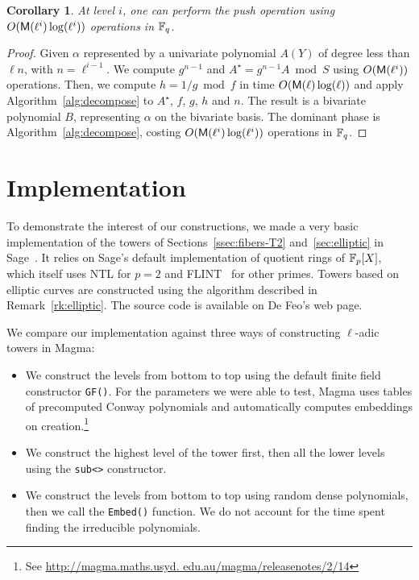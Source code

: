\documentclass{sig-alternate}
\newtheorem{corollary}[definition]{Corollary}
\begin{document}
\begin{corollary}
  At level $i$, one can perform the push operation using
  $O(\mathsf{M}(\ell^i)\log(\ell^i))$ operations in $\mathbb{F}_q$.
\end{corollary}
\begin{proof}
  Given $\alpha$ represented by a univariate polynomial $A(Y)$ of
  degree less than $\ell n$, with $n =\ell^{i-1}$. We compute
  $g^{n-1}$ and $A^\star = g^{n-1} A \bmod S$ using $O(\mathsf{M}(\ell^i))$
  operations. Then, we compute $h=1/g \bmod f$ in time
  $O(\mathsf{M}(\ell)\log(\ell))$ and apply Algorithm~\ref{alg:decompose}
  to $A^\star$, $f$, $g$, $h$ and $n$. The result is a bivariate
  polynomial $B$, representing $\alpha$ on the bivariate basis. The
  dominant phase is Algorithm~\ref{alg:decompose}, costing
  $O(\mathsf{M}(\ell^i)\log(\ell^i))$ operations in $\mathbb{F}_q$.
\end{proof}


\section{Implementation}
\label{sec:impl}
To demonstrate the interest of our constructions, we made a very basic
implementation of the towers of Sections~\ref{ssec:fibers-T2}
and~\ref{sec:elliptic} in Sage~\cite{Sage}. It relies on Sage's
default implementation of quotient rings of $\mathbb{F}_p[X]$, which itself
uses NTL \cite{shoup2003ntl} for $p=2$ and FLINT~\cite{hart2010flint}
for other primes. Towers based on elliptic curves are constructed
using the algorithm described in Remark~\ref{rk:elliptic}. The source
code is available on De Feo's web page.

We compare our implementation against three ways of constructing
$\ell$-adic towers in Magma:
\begin{itemize}
\item We construct the levels from bottom to top using the default
  finite field constructor \verb+GF()+. For the parameters we were
  able to test, Magma uses tables of precomputed Conway polynomials
  and automatically computes embeddings on
  creation.\footnote{See \scriptsize \url{http://magma.maths.usyd.
  edu.au/magma/releasenotes/2/14}}
\item We construct the highest level of the tower first, then all the
  lower levels using the \verb+sub<>+ constructor.
\item We construct the levels from bottom to top using random dense
  polynomials, then we call the \verb+Embed()+ function.  We do not
  account for the time spent finding the irreducible polynomials.
\end{itemize}
\end{document}
